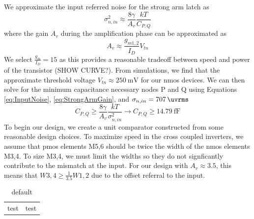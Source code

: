 \documentclass[10pt,journal]{IEEEtran}\usepackage{longtable}
\begin{document}
We approximate the input referred noise for the strong arm latch as
\begin{equation}
\sigma_{n,in}^2\approx\frac{8\gamma}{A_v}\frac{kT}{C_{P,Q}}
\label{eq:InputNoise}
\end{equation}
where the gain $A_v$ during the amplification phase can be approximated as
\begin{equation}
A_v\approx\frac{g_{m1,2}}{I_D}V_{tn}
\label{eq:StrongArmGain}
\end{equation}
We select $\frac{g_m}{I_D}=15$ as this provides a reasonable tradeoff between speed and power of the transistor (SHOW CURVE?). From simulations, we find that the approximate threshold voltage $V_{tn}\approx\SI{250}{\milli\volt}$ for our nmos devices. We can then solve for the minimum capacitance necessary nodes P and Q using Equations \ref{eq:InputNoise}, \ref{eq:StrongArmGain}, and $\sigma_{n,in}=\SI{707}{\uvrms}$ 
\begin{equation}
C_{P,Q}\geq\frac{8\gamma}{A_v}\frac{kT}{\sigma_{n,in}^2}\rightarrow C_{P,Q}\geq\SI{14.79}{\femto\farad}
\end{equation}
To begin our design, we create a unit comparator constructed from some reasonable design choices. To maximize speed in the cross coupled inverters, we assume that pmos elements M5,6 should be twice the width of the nmos elements M3,4. To size M3,4, we must limit the widths so they do not signficantly contribute to the mismatch at the input. For our design with $A_v\approx3.5$, this means that $W3,4\geq\frac{1}{3.5}W1,2$ due to the offset referral to the input. 

\begin{table}[h]
\caption{default}
\begin{center}
\begin{tabular}{|c|c|}
test & test
\end{tabular}
\end{center}
\label{default}
\end{table}%



\end{document}
